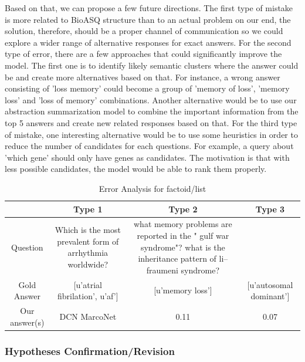 Based on that, we can propose a few future directions. The first type of mistake is more related to BioASQ structure than to an actual problem on our end, the solution, therefore, should be a proper channel of communication so we could explore a wider range of alternative responses for exact answers. For the second type of error, there are a few approaches that could significantly improve the model. The first one is to identify likely semantic clusters where the answer could be and create more alternatives based on that. For instance, a wrong answer consisting of 'loss memory' could become a group of 'memory of loss', 'memory loss' and 'loss of memory' combinations. Another alternative would be to use our abstraction summarization model to combine the important information from the top 5 answers and create new related responses based on that. For the third type of mistake, one interesting alternative would be to use some heuristics in order to reduce the number of candidates for each questions. For example, a query about 'which gene' should only have genes as candidates. The motivation is that with less possible candidates, the model would be able to rank them properly.


\begin{table}
\centering
\begin{tabular}{|c|c|c|c|}
    \hline \hline
    & Type 1 & Type 2 & Type 3\\
    \hline
     Question & Which is the most prevalent form of arrhythmia worldwide?
& what memory problems are reported in the " gulf war syndrome"?
 what is the inheritance pattern of li–fraumeni syndrome?\\
     \hline
     Gold Answer &  [u'atrial fibrilation', u'af']
& [u'memory loss'] & [u'autosomal dominant'] \\
     \hline
     Our answer(s) & DCN MarcoNet& 0.11&0.07\\
    \hline \hline
\end{tabular}
    \caption{Error Analysis for factoid/list}
    \label{tab:bioasq_res}
\end{table}



\subsubsection{Hypotheses Confirmation/Revision}

